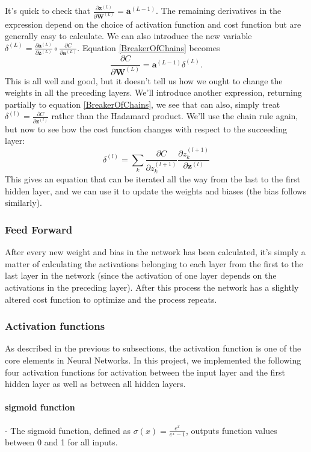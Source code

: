 \documentclass[11pt,a4paper,titlepage]{article}
\begin{document}
It's quick to check that $\frac{\partial \textbf{z}^{(L)}}{\partial \textbf{W}^{(L)}} = \textbf{a}^{(L-1)}$. The remaining derivatives in the expression depend on the choice of activation function and cost function but are generally easy to calculate. We can also introduce the new variable $\delta^{(L)} = \frac{\partial \textbf{a}^{(L)}}{\partial \textbf{z}^{(L)}}\circ
\frac{\partial C}{\partial \textbf{a}^{(L)}}$. Equation \eqref{BreakerOfChains} becomes 
\begin{equation}
\frac{\partial C}{\partial \textbf{W}^{(L)}} = \textbf{a}^{(L-1)}\delta^{(L)}.
\end{equation}
This is all well and good, but it doesn't tell us how we ought to change the weights in all the preceding layers. We'll introduce another expression, returning partially to equation \eqref{BreakerOfChains}, we see that can also, simply treat $\delta^{(l)} = \frac{\partial C}{\partial \textbf{z}^{(l)}}$ rather than the Hadamard product. We'll use the chain rule again, but now to see how the cost function changes with respect to the succeeding layer:
\begin{equation}
\delta^{(l)} =\sum_k \frac{\partial C}{\partial z_k^{(l+1)}}\frac{\partial z_k^{(l+1)}}{\partial \textbf{z}^{(l)}}
\end{equation}
This gives an equation that can be iterated all the way from the last to the first hidden layer, and we can use it to update the weights and biases (the bias follows similarly). 
\subsubsection{Feed Forward}
After every new weight and bias in the network has been calculated, it's simply a matter of calculating the activations belonging to each layer from the first to the last layer in the network (since the activation of one layer depends on the activations in the preceding layer). After this process the network has a slightly altered cost function to optimize and the process repeats. 
\subsubsection{Activation functions}
As described in the previous to subsections, the activation function is one of the core elements in Neural Networks. In this project, we implemented the following four activation functions for activation between the input layer and the first hidden layer as well as between all hidden layers. 
\paragraph*{sigmoid function} - The sigmoid function, defined as $\sigma(x)=\frac{e^x}{e^x-1}$, outputs function values between 0 and 1 for all inputs. 
\end{document}
